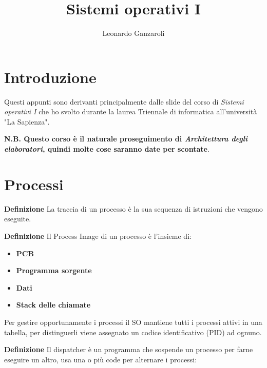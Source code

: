 \documentclass{article}
\title{Sistemi operativi I}
\author{Leonardo Ganzaroli}
\date{}
\begin{document}
\maketitle


\tableofcontents

\hypersetup{allcolors=black}

\newpage

\section*{Introduzione}

Questi appunti sono derivanti principalmente dalle slide del corso di \textit{Sistemi operativi I} che ho svolto durante la laurea Triennale di informatica all'università "La Sapienza".\newline

\noindent \textbf{N.B. Questo corso è il naturale proseguimento di \textit{Architettura degli elaboratori}, quindi molte cose saranno date per scontate}.

\newpage

\section{Processi}

\textbf{Definizione} La traccia di un processo è la sua sequenza di istruzioni che vengono eseguite.\newline

\noindent\textbf{Definizione} Il Process Image di un processo è l'insieme di:
\begin{itemize}
    \item \textbf{PCB}
    \item \textbf{Programma sorgente}
    \item \textbf{Dati}
    \item \textbf{Stack delle chiamate}\newline
\end{itemize}

\noindent Per gestire opportunamente i processi il SO mantiene tutti i processi attivi in una tabella, per distinguerli viene assegnato un codice identificativo (PID) ad ognuno.\newline

\noindent\textbf{Definizione} Il dispatcher è un programma che sospende un processo per farne eseguire un altro, usa una o più code per alternare i processi:\newline
\end{document}
